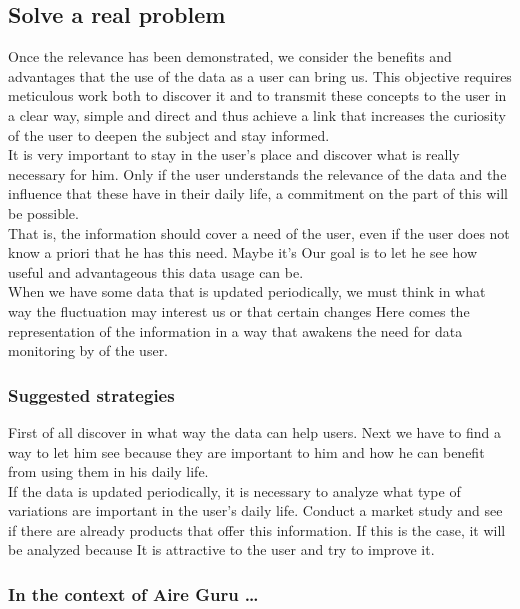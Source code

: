 \subsection{Solve a real problem}

Once the relevance has been demonstrated, we consider the benefits and advantages that the use of the data as a user can bring us.
This objective requires meticulous work both to discover it and to transmit these concepts to the user in a clear way,
simple and direct and thus achieve a link that increases the curiosity of the user to deepen the subject and
stay informed.\\

It is very important to stay in the user's place and discover what is really necessary for him. Only if the user understands the relevance of
the data and the influence that these have in their daily life, a commitment on the part of this will be possible.\\

That is, the information should cover a need of the user, even if the user does not know a priori that he has this need. Maybe it's
Our goal is to let he see how useful and advantageous this data usage can be.\\

When we have some data that is updated periodically, we must think in what way the fluctuation may interest us or that certain
changes Here comes the representation of the information in a way that awakens the need for data monitoring by
of the user.

\subsubsection*{Suggested strategies} 

First of all discover in what way the data can help users. Next we have to find a way to let him see
because they are important to him and how he can benefit from using them in his daily life.\\

If the data is updated periodically, it is necessary to analyze what type of variations are important in the user's daily life.
Conduct a market study and see if there are already products that offer this information. If this is the case, it will be analyzed because
It is attractive to the user and try to improve it.

\subsubsection*{In the context of Aire Guru \ldots} 

